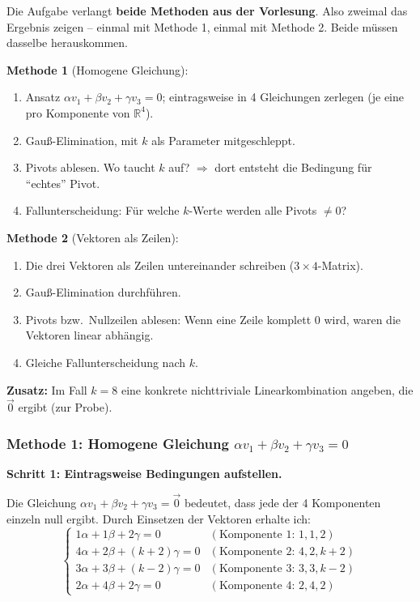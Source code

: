 \documentclass[a4paper,12pt]{article}
\begin{document}
\begin{wastun}
Die Aufgabe verlangt \textbf{beide Methoden aus der Vorlesung}. Also zweimal das Ergebnis zeigen -- einmal mit Methode 1, einmal mit Methode 2. Beide m\"ussen dasselbe herauskommen.

\medskip

\textbf{Methode 1} (Homogene Gleichung):
\begin{enumerate}[leftmargin=*, nosep]
    \item Ansatz $\alpha v_1 + \beta v_2 + \gamma v_3 = 0$; eintragsweise in 4 Gleichungen zerlegen (je eine pro Komponente von $\mathbb{R}^4$).
    \item Gau\ss-Elimination, mit $k$ als Parameter mitgeschleppt.
    \item Pivots ablesen. Wo taucht $k$ auf? $\Rightarrow$ dort entsteht die Bedingung f\"ur ``echtes'' Pivot.
    \item Fallunterscheidung: F\"ur welche $k$-Werte werden alle Pivots $\neq 0$?
\end{enumerate}

\textbf{Methode 2} (Vektoren als Zeilen):
\begin{enumerate}[leftmargin=*, nosep]
    \item Die drei Vektoren als Zeilen untereinander schreiben ($3 \times 4$-Matrix).
    \item Gau\ss-Elimination durchf\"uhren.
    \item Pivots bzw.\ Nullzeilen ablesen: Wenn eine Zeile komplett $0$ wird, waren die Vektoren linear abh\"angig.
    \item Gleiche Fallunterscheidung nach $k$.
\end{enumerate}

\textbf{Zusatz:} Im Fall $k = 8$ eine konkrete nichttriviale Linearkombination angeben, die $\vec 0$ ergibt (zur Probe).
\end{wastun}

\bigskip

\subsubsection*{Methode 1: Homogene Gleichung $\alpha v_1 + \beta v_2 + \gamma v_3 = 0$}

\textbf{Schritt 1: Eintragsweise Bedingungen aufstellen.}

Die Gleichung $\alpha v_1 + \beta v_2 + \gamma v_3 = \vec 0$ bedeutet, dass jede der 4
Komponenten einzeln null ergibt. Durch Einsetzen der Vektoren erhalte ich:
\[
\begin{cases}
1\alpha + 1\beta + 2\gamma = 0 & (\text{Komponente 1: } 1, 1, 2) \\
4\alpha + 2\beta + (k+2)\gamma = 0 & (\text{Komponente 2: } 4, 2, k+2) \\
3\alpha + 3\beta + (k-2)\gamma = 0 & (\text{Komponente 3: } 3, 3, k-2) \\
2\alpha + 4\beta + 2\gamma = 0 & (\text{Komponente 4: } 2, 4, 2)
\end{cases}
\]
\end{document}
